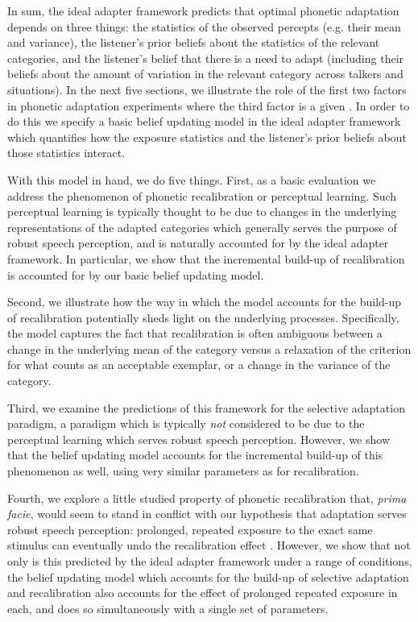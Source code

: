 In sum, the ideal adapter framework predicts that optimal phonetic adaptation depends on three things: the statistics of the observed percepts (e.g. their mean and variance), the listener's prior beliefs about the statistics of the relevant categories, and the listener's belief that there is a need to adapt (including their beliefs about the amount of variation in the relevant category across talkers and situations). In the next five sections, we illustrate the role of the first two factors in phonetic adaptation experiments where the third factor is a given \autocite[i.e., where there is a clear need to adapt and for which previous work has shown that listeners indeed adapt,][]{Bertelson2003,Kraljic2005,Norris2003}.  In order to do this we specify a basic belief updating model in the ideal adapter framework which quantifies how the exposure statistics and the listener's prior beliefs about those statistics interact.

With this model in hand, we do five things.  First, as a basic evaluation we address the phenomenon of phonetic recalibration or perceptual learning. %
Such perceptual learning is typically thought to be due to changes in the underlying representations of the adapted categories which generally serves the purpose of robust speech perception, and is naturally accounted for by the ideal adapter framework.  In particular, we show that the incremental build-up of recalibration is accounted for by our basic belief updating model.

Second, we illustrate how the way in which the model accounts for the build-up of recalibration potentially sheds light on the underlying processes. %
Specifically, the model captures the fact that recalibration is often ambiguous between a change in the underlying mean of the category versus a relaxation of the criterion for what counts as an acceptable exemplar, or a change in the variance of the category.

Third, we examine the predictions of this framework for the selective adaptation paradigm, a paradigm which is typically \emph{not} considered to be due to the perceptual learning which serves robust speech perception.  However, we show that the belief updating model accounts for the incremental build-up of this phenomenon as well, using very similar parameters as for recalibration.

Fourth, we explore a little studied property of phonetic recalibration that, {\em prima facie}, would seem to stand in conflict with our hypothesis that adaptation serves robust speech perception: prolonged, repeated exposure to the exact same stimulus can eventually undo the recalibration effect \autocite{Vroomen2007}.  However, we show that not only is this predicted by the ideal adapter framework under a range of conditions, the belief updating model which accounts for the build-up of selective adaptation and recalibration also accounts for the effect of prolonged repeated exposure in each, and does so simultaneously with a single set of parameters.%


